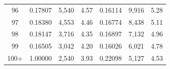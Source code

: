 \begin{tabular}{cccc|ccc}
96   & 0.17807                                                          & 5,540                                                                                             & 4.57                                                                                                                       & 0.16114                                                          & 9,916                                                                                             & 5.28                                                                                                                       \\
97   & 0.18380                                                          & 4,553                                                                                             & 4.46                                                                                                                       & 0.16774                                                          & 8,438                                                                                             & 5.11                                                                                                                       \\
98   & 0.18147                                                          & 3,716                                                                                             & 4.35                                                                                                                       & 0.16897                                                          & 7,132                                                                                             & 4.96                                                                                                                       \\
99   & 0.16505                                                          & 3,042                                                                                             & 4.20                                                                                                                       & 0.16026                                                          & 6,021                                                                                             & 4.78                                                                                                                       \\
100+ & 1.00000                                                          & 2,540                                                                                             & 3.93                                                                                                                       & 0.22098                                                          & 5,127                                                                                             & 4.53\\
\bottomrule
\end{tabular}